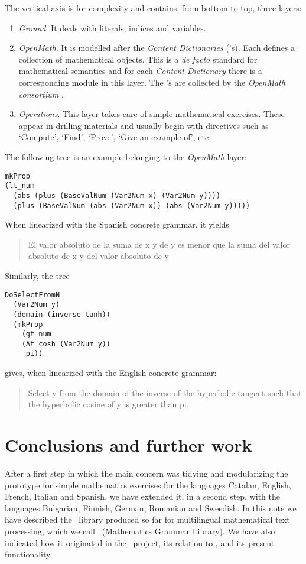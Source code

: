 \documentclass[adraft,copyright,creativecommons]{eptcs}
\begin{document}
The vertical axis is for complexity and contains, from bottom to top, three
layers:

\begin{enumerate}
\item\emph{Ground}. It deals with literals, indices and variables.
\item\emph{OpenMath}. It is modelled after the \OM{ } \emph{Content
Dictionaries} (\CD's). Each \CD{} defines a collection of
mathematical objects. This is a \emph{de facto} standard for mathematical
semantics and for each \emph{Content Dictionary}
there is a corresponding module in this layer.
The \CD's are collected by the
\emph{OpenMath consortium} \cite{OpenMath}.
\item\emph{Operations}.
This layer takes care of simple mathematical exercises. These appear
in drilling materials and usually begin with directives such as
`Compute', `Find', `Prove', `Give an example of', etc.
\end{enumerate}

The following tree is an example belonging to the \emph{OpenMath} layer:
\begin{lstlisting}
mkProp
(lt_num
  (abs (plus (BaseValNum (Var2Num x) (Var2Num y))))
  (plus (BaseValNum (abs (Var2Num x)) (abs (Var2Num y)))))
\end{lstlisting}
When linearized with the Spanish concrete grammar, it yields
\begin{quote}
El valor absoluto de la suma  de x y de y es menor que la suma del valor
absoluto  de x y del valor absoluto de y
\end{quote}
\noindent Similarly, the tree
\begin{lstlisting}
DoSelectFromN
  (Var2Num y)
  (domain (inverse tanh))
  (mkProp
    (gt_num
    (At cosh (Var2Num y))
     pi))
\end{lstlisting}
gives, when linearized with the English concrete grammar:
\begin{quote}
Select y from the domain of the inverse of the hyperbolic tangent such that
the hyperbolic cosine of y is greater than pi.
\end{quote}


\section{Conclusions and further work} %
\label{sec:conclusions}

After a first step in which the main concern was tidying and modularizing
the \webalt{} prototype for simple mathematics exercises for the languages
Catalan,
English,
French,
Italian and
Spanish,
we have extended it, in a second step, with the languages
Bulgarian, Finnish,
German, Romanian and Sweedish.
In this note we have described the \GF\ library produced so far for
multilingual mathematical text processing, which we call
\MGL\ (Mathematics Grammar Library). We have also indicated how it
originated in the \webalt\ project, its relation to \GF, and its
present functionality.
\end{document}
